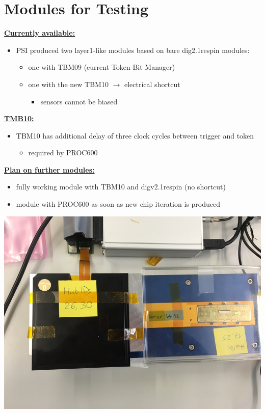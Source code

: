 \documentclass[9pt]{beamer}
\begin{document}
\section{Modules for Testing}
\begin{frame}
	\underline{\textbf{Currently available:}}
	\begin{itemize}
		\setlength{\itemsep}{\fill}
		\item PSI produced two layer1-like modules based on bare dig2.1respin modules:
		\begin{itemize}
			\item one with TBM09 (current Token Bit Manager)
			\item one with the new TBM10 $\rightarrow$ electrical shortcut
			\begin{itemize}
				\item sensors cannot be biased
			\end{itemize}
		\end{itemize}
	\end{itemize}
	\vspace*{1cm}
	\underline{\textbf{TMB10:}}
	\begin{itemize}
		\setlength{\itemsep}{\fill}
		\item TBM10 has additional delay of three clock cycles between trigger and token
		\begin{itemize}
			\item required by PROC600
		\end{itemize}
	\end{itemize}
	\vspace*{1cm}
	\underline{\textbf{Plan on further modules:}}
	\begin{itemize}
		\item fully working module with TBM10 and digv2.1respin (no shortcut)
		\item module with PROC600 as soon as new chip iteration is produced
	\end{itemize}
\end{frame}
\begin{frame}
	\begin{center}
		\includegraphics[height=0.85\textheight]{bothMod}
	\end{center}
\end{frame}
\end{document}
